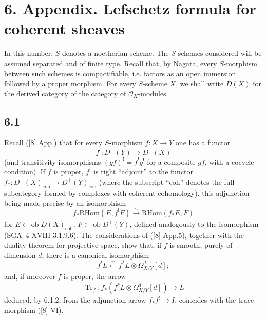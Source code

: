 \documentclass[11pt]{article}
\providecommand{\cO}{\mathcal{O}}
\providecommand{\RHom}{\mathrm{RHom}}
\providecommand{\RHom}{\mathrm{RHom}}
\providecommand{\RHom}{\mathrm R\mathcal{H}om}
\providecommand{\RHom}{\mathrm{RHom}}
\begin{document}
\section*{6. Appendix. Lefschetz formula for coherent sheaves}

In this number, $S$ denotes a noetherian scheme. The $S$-schemes considered will be assumed separated and of finite type. Recall that, by Nagata, every $S$-morphism between such schemes is compactifiable, i.e. factors as an open immersion followed by a proper morphism. For every $S$-scheme $X$, we shall write $D(X)$ for the derived category of the category of $\cO_X$-modules.

\subsection*{6.1}
Recall ([8] App.) that for every $S$-morphism $f:X\to Y$ one has a functor
\[
f^!:D^+(Y)\longrightarrow D^+(X)
\]
(and transitivity isomorphisms $(gf)^! = f^!g^!$ for a composite $gf$, with a cocycle condition). If $f$ is proper, $f^!$ is right ``adjoint'' to the functor $f_*:D^+(X)_{\mathrm{coh}}\to D^+(Y)_{\mathrm{coh}}$ (where the subscript ``coh'' denotes the full subcategory formed by complexes with coherent cohomology), this adjunction being made precise by an isomorphism
\begin{equation}
\tag{6.1.1}
f_*\RHom(E,f^!F)\xrightarrow{\sim}\RHom(f_*E,F)
\end{equation}
for $E\in\operatorname{ob}D(X)_{\mathrm{coh}}$, $F\in\operatorname{ob}D^+(Y)$, defined analogously to the isomorphism (SGA~4 XVIII 3.1.9.6). The considerations of ([8] App.5), together with the duality theorem for projective space, show that, if $f$ is smooth, purely of dimension $d$, there is a canonical isomorphism
\begin{equation}
\tag{6.1.2}
f^!L\xleftarrow{\sim} f^*L\otimes\Omega^d_{X/Y}[d];
\end{equation}
and, if moreover $f$ is proper, the arrow
\begin{equation}
\tag{6.1.3}
\operatorname{Tr}_f:f_*(f^*L\otimes\Omega^d_{X/Y}[d])\longrightarrow L
\end{equation}
deduced, by 6.1.2, from the adjunction arrow $f_*f^!\to I$, coincides with the trace morphism ([8] VI).
\end{document}
